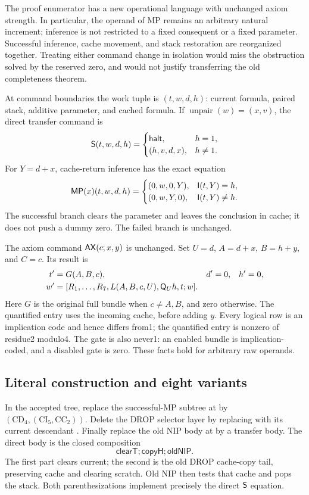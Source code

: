 The proof enumerator has a new operational language with unchanged
axiom strength. In particular, the operand of MP remains an
arbitrary natural increment; inference is not restricted to a fixed
consequent or a fixed parameter. Successful inference, cache movement,
and stack restoration are reorganized together. Treating either command
change in isolation would miss the obstruction solved by the reserved
zero, and would not justify transferring the old completeness theorem.

At command boundaries the work tuple is $(t,w,d,h)$: current formula,
paired stack, additive parameter, and cached formula. If
$\operatorname{unpair}(w)=(x,v)$, the direct transfer command is
\[
 \mathsf S(t,w,d,h)=
 \begin{cases}
  \mathsf{halt},&h=1,\\
  (h,v,d,x),&h\ne1.
 \end{cases}
\]
For $Y=d+x$, cache-return inference has the exact equation
\[
 \mathsf{MP}(x)(t,w,d,h)=
 \begin{cases}
  (0,w,0,Y),&\mathsf I(t,Y)=h,\\
  (0,w,Y,0),&\mathsf I(t,Y)\ne h.
 \end{cases}
\]
The successful branch clears the parameter and leaves the conclusion
in cache; it does not push a dummy zero. The failed branch is unchanged.

The axiom command $\mathsf{AX}(c;x,y)$ is unchanged. Set
$U=d$, $A=d+x$, $B=h+y$, and $C=c$. Its result is
\begin{align*}
 t'&=G(A,B,c),& d'&=0,&h'&=0,\\
 w'&=[R_1,\ldots,R_7,L(A,B,c,U),\mathsf Q_U h,t;w].
\end{align*}
Here $G$ is the original full bundle when $c\ne A,B$, and zero
otherwise. The quantified entry uses the incoming cache, before adding
$y$. Every logical row is an implication code and hence differs from1;
the quantified entry is nonzero of residue2 modulo4. The gate is also
never1: an enabled bundle is implication-coded, and a disabled gate
is zero. These facts hold for arbitrary raw operands.

\subsection{Literal construction and eight variants}

In the accepted tree, replace the successful-MP subtree at
 by $(\mathrm{CD}_4,
(\mathrm{CI}_5,\mathrm{CC}_2))$. Delete the DROP selector layer
by replacing  with its current descendant
. Finally replace the old NIP body at 
by a transfer body. The direct body is the closed composition
\[
 \mathsf{clearT};\mathsf{copyH};\mathsf{oldNIP}.
\]
The first part clears current; the second is the old DROP cache-copy
tail, preserving cache and clearing scratch. Old NIP then tests that
cache and pops the stack. Both parenthesizations implement precisely
the direct $\mathsf S$ equation.

